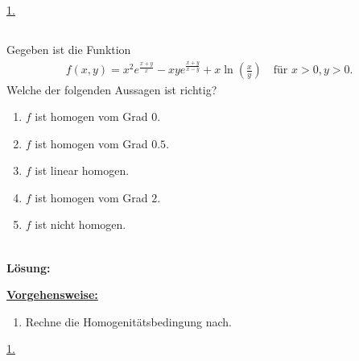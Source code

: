 \underline{1.}\\




\newpage



\subsection*{}
Gegeben ist die Funktion
\begin{align*}
	f(x,y) 
	=
	x^2 e^{\frac{x+y}{x}}
	-
	xy e^{\frac{x+y}{x-y}}
	+
	x \ln \left( \frac{x}{y} \right)
	\quad \textrm{für } x>0,y>0.
\end{align*}
Welche der folgenden Aussagen ist richtig?
\renewcommand{\labelenumi}{(\alph{enumi})}
\begin{enumerate}
	\item
	$ f  $ ist homogen vom Grad $ 0 $.
	\item
	$ f  $ ist homogen vom Grad $ 0.5 $.
	\item
	$ f $ ist linear homogen.	
	\item 
	$ f  $ ist homogen vom Grad $ 2 $.
	\item
	$ f $ ist nicht homogen.
\end{enumerate}
\ \\
\textbf{Lösung:}
\begin{mdframed}
\underline{\textbf{Vorgehensweise:}}
\renewcommand{\labelenumi}{\theenumi.}
\begin{enumerate}
\item Rechne die Homogenitätsbedingung nach.
\end{enumerate}
\end{mdframed}

\underline{1. }\\


\newpage

